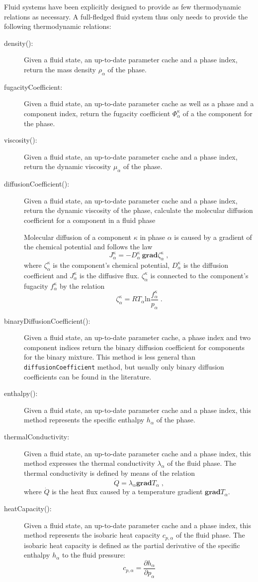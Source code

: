 Fluid systems have been explicitly designed to provide as few
thermodynamic relations as necessary. A full-fledged fluid system thus
only needs to provide the following thermodynamic relations:
\begin{description}
\item[density():] Given a fluid state, an up-to-date parameter
  cache and a phase index, return the mass density $\rho_\alpha$ of the phase.
\item[fugacityCoefficient:] Given a fluid state, an up-to-date
  parameter cache as well as a phase and a component index, return the
  fugacity coefficient $\Phi^\kappa_\alpha$ of a the component for the phase.
\item[viscosity():] Given a fluid state, an up-to-date parameter
  cache and a phase index, return the dynamic viscosity $\mu_\alpha$ of the phase.
\item[diffusionCoefficient():] Given a fluid state, an
  up-to-date parameter cache and a phase index, return the dynamic
  viscosity of the phase, calculate the molecular diffusion
  coefficient for a component in a fluid phase
  
  Molecular diffusion of a component $\kappa$ in phase $\alpha$ is
  caused by a gradient of the chemical potential and follows the law
  \[ 
  J^\kappa_\alpha = - D^\kappa_\alpha\ \mathbf{grad} \zeta^\kappa_\alpha\;,
  \] 
  where $\zeta^\kappa_\alpha$ is the component's chemical potential,
  $D^\kappa_\alpha$ is the diffusion coefficient and $J^\kappa_\alpha$ is the
  diffusive flux. $\zeta^\kappa_\alpha$ is connected to the
  component's fugacity $f^\kappa_\alpha$ by the relation
  \[ 
  \zeta^\kappa_\alpha = 
  R T_\alpha \mathrm{ln} \frac{f^\kappa_\alpha}{p_\alpha} \;.
  \]
\item[binaryDiffusionCoefficient():] Given a fluid state, an
  up-to-date parameter cache, a phase index and two
  component indices return the binary diffusion coefficient for
  components for the binary mixture. This method is less general than
  \texttt{diffusionCoefficient} method, but usually only binary
  diffusion coefficients can be found in the literature.
\item[enthalpy():] Given a fluid state, an up-to-date parameter
  cache and a phase index, this method represents the specific
  enthalpy $h_\alpha$ of the phase.
\item[thermalConductivity:] Given a fluid state, an
  up-to-date parameter cache and a phase index, this method expresses
  the thermal conductivity $\lambda_\alpha$ of the fluid phase. The
  thermal conductivity is defined by means of the relation
  \[
  \dot Q = \lambda_\alpha \mathbf{grad} T_\alpha \;,
  \]
  where $\dot Q$ is the heat flux caused by a temperature gradient
  $\mathbf{grad} T_\alpha$.
\item[heatCapacity():] Given a fluid state, an up-to-date
  parameter cache and a phase index, this method represents the
  isobaric heat capacity $c_{p,\alpha}$ of the fluid phase. The
  isobaric heat capacity is defined as the partial derivative of the
  specific enthalpy $h_\alpha$ to the fluid pressure:
  \[
  c_{p,\alpha} = \frac{\partial h_\alpha}{\partial p_\alpha}
  \]
\end{description}

